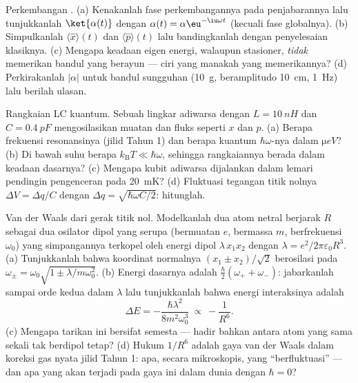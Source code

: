 \begin{exercise}[$\star\star$]\label{exo:b3:harmonic-oscillator:8}
Perkembangan . (a) Kenakanlah fase perkembangannya pada
penjabarannya lalu tunjukkanlah $\ket{\alpha(t)}$ dengan $\alpha(t) =
\alpha\eu^{-\iu\omega t}$ (kecuali fase globalnya). (b) Simpulkanlah
$\langle\hat x\rangle(t)$ dan $\langle\hat p\rangle(t)$ lalu
bandingkanlah dengan penyelesaian klasiknya. (c) Mengapa keadaan eigen
energi, walaupun stasioner, \emph{tidak} memerikan bandul yang berayun
--- ciri  yang manakah yang memerikannya? (d)
Perkirakanlah $|\alpha|$ untuk bandul sungguhan (\qty{10}{g},
beramplitudo \qty{10}{cm}, \qty{1}{Hz}) lalu berilah ulasan.
\end{exercise}

\begin{exercise}[$\star\star$]\label{exo:b3:harmonic-oscillator:9}
Rangkaian LC kuantum. Sebuah lingkar adiwarsa dengan $L =
\qty{10}{nH}$ dan $C = \qty{0.4}{pF}$ mengosilasikan muatan dan fluks
seperti $x$ dan $p$. (a) Berapa frekuensi resonansinya (jilid Tahun 1)
dan berapa kuantum $\hbar\omega$-nya dalam $\unit{\micro eV}$? (b) Di
bawah suhu berapa $k_{\text{B}}T \ll \hbar\omega$, sehingga rangkaiannya
berada dalam keadaan dasarnya? (c) Mengapa kubit adiwarsa dijalankan
dalam lemari pendingin pengenceran pada \qty{20}{mK}? (d) Fluktuasi
tegangan titik nolnya $\Delta V = \Delta q/C$ dengan $\Delta q =
\sqrt{\hbar\omega C/2}$: hitunglah.
\end{exercise}

\begin{exercise}[$\star\star\star$]\label{exo:b3:harmonic-oscillator:10}
Van der Waals dari gerak titik nol. Modelkanlah dua atom netral
berjarak $R$ sebagai dua osilator dipol yang serupa (bermuatan $e$,
bermassa $m$, berfrekuensi $\omega_0$) yang simpangannya terkopel oleh
energi dipol $\lambda\,x_1x_2$ dengan $\lambda = e^2/2\pi\varepsilon_0R^3$.
(a) Tunjukkanlah bahwa koordinat normalnya $(x_1 \pm x_2)/\sqrt2$
berosilasi pada
$\omega_\pm = \omega_0\sqrt{1 \pm \lambda/m\omega_0^2}$. (b) Energi
dasarnya adalah $\tfrac\hbar2(\omega_+ + \omega_-)$: jabarkanlah sampai
orde kedua dalam $\lambda$ lalu tunjukkanlah bahwa energi interaksinya
adalah
\[
\Delta E = -\frac{\hbar\lambda^2}{8m^2\omega_0^3}
\ \propto\ -\frac{1}{R^6} .
\]
(c) Mengapa tarikan ini bersifat semesta --- hadir bahkan antara atom
yang sama sekali tak berdipol tetap? (d) Hukum $1/R^6$ adalah gaya van
der Waals dalam koreksi gas nyata jilid Tahun 1: apa, secara mikroskopis,
yang ``berfluktuasi'' --- dan apa yang akan terjadi pada gaya ini dalam
dunia dengan $\hbar = 0$?
\end{exercise}

